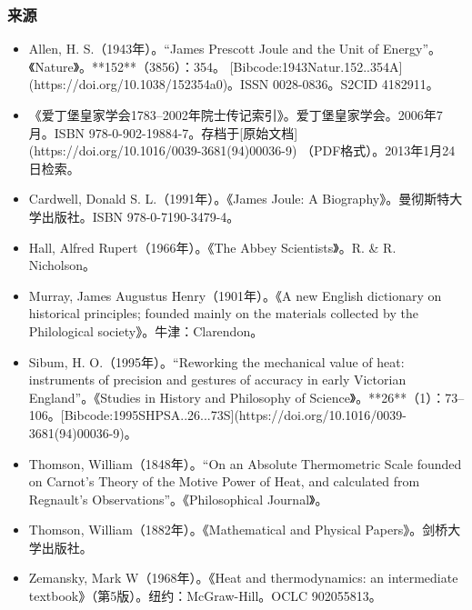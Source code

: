 \subsubsection{来源}
\begin{itemize}
\item Allen, H. S.（1943年）。“James Prescott Joule and the Unit of Energy”。《Nature》。**152**（3856）：354。 [Bibcode:1943Natur.152..354A](https://doi.org/10.1038/152354a0)。ISSN 0028-0836。S2CID 4182911。
\item 《爱丁堡皇家学会1783–2002年院士传记索引》。爱丁堡皇家学会。2006年7月。ISBN 978-0-902-19884-7。存档于[原始文档](https://doi.org/10.1016/0039-3681(94)00036-9) （PDF格式）。2013年1月24日检索。
\item Cardwell, Donald S. L.（1991年）。《James Joule: A Biography》。曼彻斯特大学出版社。ISBN 978-0-7190-3479-4。
\item Hall, Alfred Rupert（1966年）。《The Abbey Scientists》。R. & R. Nicholson。
\item Murray, James Augustus Henry（1901年）。《A new English dictionary on historical principles; founded mainly on the materials collected by the Philological society》。牛津：Clarendon。
\item Sibum, H. O.（1995年）。“Reworking the mechanical value of heat: instruments of precision and gestures of accuracy in early Victorian England”。《Studies in History and Philosophy of Science》。**26**（1）：73–106。[Bibcode:1995SHPSA..26...73S](https://doi.org/10.1016/0039-3681(94)00036-9)。
\item Thomson, William（1848年）。“On an Absolute Thermometric Scale founded on Carnot's Theory of the Motive Power of Heat, and calculated from Regnault's Observations”。《Philosophical Journal》。
\item Thomson, William（1882年）。《Mathematical and Physical Papers》。剑桥大学出版社。
\item Zemansky, Mark W（1968年）。《Heat and thermodynamics: an intermediate textbook》（第5版）。纽约：McGraw-Hill。OCLC 902055813。
\end{itemize}
